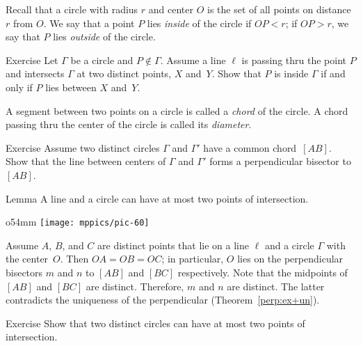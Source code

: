 Recall that a circle with radius $r$ and center $O$ is the set of all points on distance $r$ from $O$.
We say that a point $P$ lies \emph{inside} of the circle if $OP<r$; 
if $OP>r$, we say that $P$ lies \emph{outside} of the circle.
\label{def:circle}

\begin{thm}{Exercise}\label{ex:inside-outside}
Let $\Gamma$ be a circle and $P\notin \Gamma$.
Assume a line $\ell$ is passing thru the point $P$
and intersects $\Gamma$ at two distinct points, $X$ and~$Y$.
Show that $P$ is inside $\Gamma$ if and only if $P$ lies between $X$ and~$Y$.
\end{thm}


A segment between two points on a circle is called a \emph{chord} of the circle.
A chord passing thru the center of the circle is called its \emph{diameter}.

\begin{thm}{Exercise}\label{ex:chord-perp}
Assume two distinct circles $\Gamma$ and $\Gamma'$ have a common chord~$[A B]$.
Show that the line between centers of $\Gamma$ and $\Gamma'$ forms a perpendicular bisector to~$[A B]$.
\end{thm}



\begin{thm}[\abs]{Lemma}\label{lem:line-circle}
A line and a circle can have at most two points of intersection.
\end{thm}

\begin{wrapfigure}{o}{54mm}
\vskip-4mm
\centering
\texttt{[image: mppics/pic-60]}
\end{wrapfigure}

 Assume $A$, $B$, and $C$ are distinct points that lie on a line $\ell$ and a circle $\Gamma$ with the center~$O$.
Then $OA=OB=OC$; in particular, $O$ lies on the perpendicular bisectors 
$m$ and $n$ to $[A B]$ and $[B C]$ respectively.
Note that the midpoints of $[AB]$ and $[BC]$ are distinct.
Therefore, $m$ and $n$ are distinct.
The latter contradicts the uniqueness of the perpendicular (Theorem~\ref{perp:ex+un}).
\qeds

\begin{thm}{Exercise}\label{ex:two-circ}
Show that two distinct circles can have at most two points of intersection.
\end{thm}

